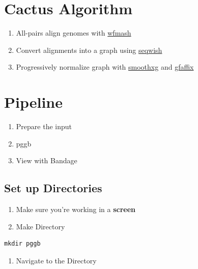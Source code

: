 \documentclass[
]{book}
\providecommand{\tightlist}{%
  \setlength{\itemsep}{0pt}\setlength{\parskip}{0pt}}
\begin{document}
\hypertarget{cactus-algorithm-1}{%
\section{Cactus Algorithm}\label{cactus-algorithm-1}}

\begin{enumerate}
\def\labelenumi{\arabic{enumi}.}
\tightlist
\item
  All-pairs align genomes with \href{https://github.com/waveygang/wfmash}{wfmash}
\item
  Convert alignments into a graph using \href{https://github.com/ekg/seqwish}{seqwish}
\item
  Progressively normalize graph with \href{https://github.com/pangenome/smoothxg}{smoothxg} and \href{https://github.com/marschall-lab/GFAffix}{gfaffix}
\end{enumerate}

\hypertarget{pipeline-3}{%
\section{Pipeline}\label{pipeline-3}}

\begin{enumerate}
\def\labelenumi{\arabic{enumi}.}
\tightlist
\item
  Prepare the input
\item
  pggb
\item
  View with Bandage
\end{enumerate}

\hypertarget{set-up-directories-2}{%
\subsection{Set up Directories}\label{set-up-directories-2}}

\begin{enumerate}
\def\labelenumi{\arabic{enumi}.}
\item
  Make sure you're working in a \textbf{screen}
\item
  Make Directory
\end{enumerate}

\begin{verbatim}
mkdir pggb
\end{verbatim}

\begin{enumerate}
\def\labelenumi{\arabic{enumi}.}
\setcounter{enumi}{2}
\tightlist
\item
  Navigate to the Directory
\end{enumerate}
\end{document}
